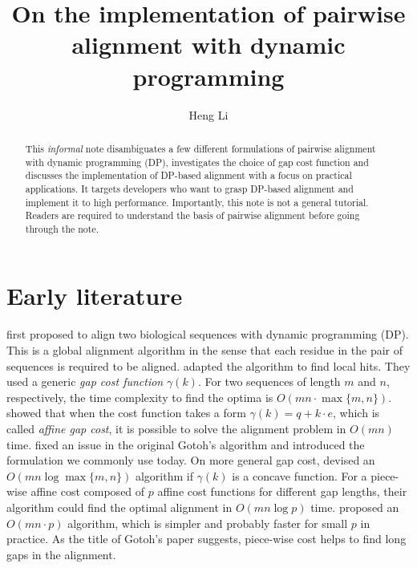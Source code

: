 \documentclass{bioinfo}
\begin{document}

\title[Alignment with DP]{On the implementation of pairwise alignment with dynamic programming}
\author[Li]{Heng Li}
\address{Broad Institute, 415 Main Street, Cambridge, MA 02142, USA}

\maketitle

\begin{abstract}
This \emph{informal} note disambiguates a few different formulations of
pairwise alignment with dynamic programming (DP), investigates the choice of
gap cost function and discusses the implementation of DP-based alignment with a
focus on practical applications. It targets developers who want to grasp
DP-based alignment and implement it to high performance. Importantly, this note
is not a general tutorial. Readers are required to understand the basis of
pairwise alignment before going through the note.
\end{abstract}

\section{Early literature}

\citet{Needleman:1970aa} first proposed to align two biological sequences with
dynamic programming (DP). This is a global alignment algorithm in the sense
that each residue in the pair of sequences is required to be aligned.
\citet{Smith:1981aa} adapted the algorithm to find local hits. They used a
generic \emph{gap cost function} $\gamma(k)$. For two sequences of length $m$
and $n$, respectively, the time complexity to find the optima is
$O(mn\cdot\max\{m,n\})$. \citet{Gotoh:1982aa} showed that when the cost
function takes a form $\gamma(k)=q+k\cdot e$, which is called \emph{affine gap
cost}, it is possible to solve the alignment problem in $O(mn)$ time.
\citet{Altschul:1986aa} fixed an issue in the original Gotoh's algorithm and
introduced the formulation we commonly use today. On more general
gap cost, \citet{Miller:1988aa} devised an $O(mn\log\max\{m,n\})$ algorithm
if $\gamma(k)$ is a concave function. For a piece-wise affine cost composed of
$p$ affine cost functions for different gap lengths, their algorithm could find
the optimal alignment in $O(mn\log p)$ time. \citet{Gotoh:1990aa} proposed an
$O(mn\cdot p)$ algorithm, which is simpler and probably faster for small $p$ in
practice. As the title of Gotoh's paper suggests, piece-wise cost helps
to find long gaps in the alignment.
\end{document}

